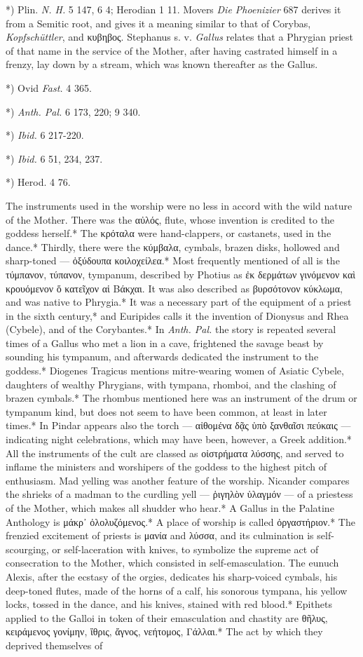 \documentclass[a4paper, 11pt, oneside, polutonikogreek, english]{article}
\begin{document}
*) Plin. \emph{N. H.} 5 147, 6 4; Herodian 1 11. Movers \emph{Die Phoenizier} 687 derives it from a Semitic root, and gives it a meaning similar to that of Corybas, \emph{Kopfschüttler}, and κυβηβος. Stephanus s. v. \emph{Gallus} relates that a Phrygian priest of that name in the service of the Mother, after having castrated himself in a frenzy, lay down by a stream, which was known thereafter as the Gallus.

*) Ovid \emph{Fast.} 4 365.

*) \emph{Anth. Pal.} 6 173, 220; 9 340.

*) \emph{Ibid.} 6 217-220.

*) \emph{Ibid.} 6 51, 234, 237.

*) Herod. 4 76.

The instruments used in the worship were no less in accord with the wild nature of the Mother. There was the αὐλός, flute, whose invention is credited to the goddess herself.* The κρόταλα were hand-clappers, or castanets, used in the dance.* Thirdly, there were the κύμβαλα, cymbals, brazen disks, hollowed and sharp-toned --- ὀξύδουπα κοιλοχείλεα.* Most frequently mentioned of all is the τύμπανον, τύπανον, tympanum, described by Photius as ἐκ δερμάτων γινόμενον καὶ κρουόμενον ὅ κατεῖχον αἱ Βάκχαι. It was also described as βυρσότονον κύκλωμα, and was native to Phrygia.* It was a necessary part of the equipment of a priest in the sixth century,* and Euripides calls it the invention of Dionysus and Rhea (Cybele), and of the Corybantes.* In \emph{Anth. Pal.} the story is repeated several times of a Gallus who met a lion in a cave, frightened the savage beast by sounding his tympanum, and afterwards dedicated the instrument to the goddess.* Diogenes Tragicus mentions mitre-wearing women of Asiatic Cybele, daughters of wealthy Phrygians, with tympana, rhomboi, and the clashing of brazen cymbals.* The rhombus mentioned here was an instrument of the drum or tympanum kind, but does not seem to have been common, at least in later times.* In Pindar appears also the torch --- αἰθομένα δᾷς ὑπὸ ξανθαῖσι πεύκαις --- indicating night celebrations, which may have been, however, a Greek addition.* All the instruments of the cult are classed as οἰστρήματα λύσσης, and served to inflame the ministers and worshipers of the goddess to the highest pitch of enthusiasm. Mad yelling was another feature of the worship. Nicander compares the shrieks of a madman to the curdling yell --- ῥιγηλὸν ὑλαγμόν --- of a priestess of the Mother, which makes all shudder who hear.* A Gallus in the Palatine Anthology is μάκρ᾽ ὀλολυζόμενος.* A place of worship is called ὀργαστήριον.* The frenzied excitement of priests is μανία and λύσσα, and its culmination is self-scourging, or self-laceration with knives, to symbolize the supreme act of consecration to the Mother, which consisted in self-emasculation. The eunuch Alexis, after the ecstasy of the orgies, dedicates his sharp-voiced cymbals, his deep-toned flutes, made of the horns of a calf, his sonorous tympana, his yellow locks, tossed in the dance, and his knives, stained with red blood.* Epithets applied to the Galloi in token of their emasculation and chastity are θῆλυς, κειράμενος γονίμην, ἴθρις, ἄγνος, νεήτομος, Γάλλαι.* The act by which they deprived themselves of 
\end{document}
